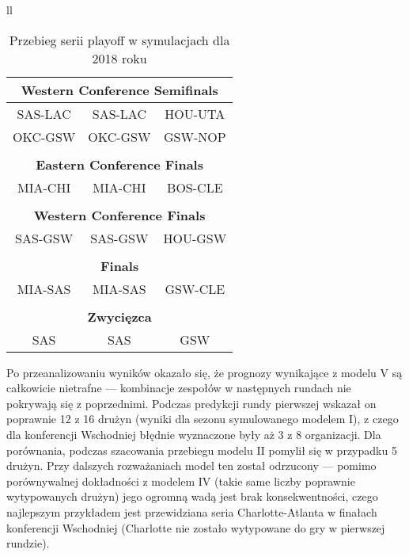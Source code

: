 \documentclass[inzynierska]{pwr_wmat_praca_dyplomowa}
\theoremstyle{plain}
\numberwithin{theorem}{chapter}
\theoremstyle{definition}
\numberwithin{theorem}{chapter}
\begin{document}
\begin{table}[]
\begin{tabular}{ll}
\begin{tabular}{ |c|c|c|  }
		\multicolumn{3}{|c|}{\textbf{Western Conference Semifinals}} \\\hline
		SAS-LAC& SAS-LAC&HOU-UTA\\\hline
		OKC-GSW& OKC-GSW&GSW-NOP\\\hline
		\multicolumn{3}{|c|}{} \\\hline
		
		\multicolumn{3}{|c|}{\textbf{Eastern Conference Finals}} \\\hline
		MIA-CHI& MIA-CHI&BOS-CLE\\\hline
		\multicolumn{3}{|c|}{} \\\hline
		
		\multicolumn{3}{|c|}{\textbf{Western Conference Finals}} \\\hline
		SAS-GSW& SAS-GSW&HOU-GSW\\\hline
		\multicolumn{3}{|c|}{} \\\hline
		
		\multicolumn{3}{|c|}{\textbf{Finals}} \\\hline
		MIA-SAS&  MIA-SAS&GSW-CLE\\\hline
		\multicolumn{3}{|c|}{} \\\hline
		
		\multicolumn{3}{|c|}{\textbf{Zwycięzca}} \\\hline
		SAS&  SAS&GSW\\\hline
	\end{tabular}
\end{tabular}
	\caption{Przebieg serii playoff w symulacjach dla 2018 roku}\label{tabela_playoffs2018}
\end{table}

Po przeanalizowaniu wyników okazało się, że prognozy wynikające z modelu V są całkowicie nietrafne --- kombinacje zespołów w następnych rundach nie pokrywają się z poprzednimi. Podczas predykcji rundy pierwszej wskazał on poprawnie 12 z 16 drużyn (wyniki dla sezonu symulowanego modelem I), z czego dla konferencji Wschodniej błędnie wyznaczone były aż 3 z 8 organizacji. Dla porównania, podczas szacowania przebiegu modelu II pomylił się w przypadku 5 drużyn. Przy dalszych rozważaniach model ten został odrzucony --- pomimo porównywalnej dokładności z modelem IV (takie same liczby poprawnie wytypowanych drużyn) jego ogromną wadą jest brak konsekwentności, czego najlepszym przykładem jest przewidziana seria Charlotte-Atlanta w finałach konferencji Wschodniej (Charlotte nie zostało wytypowane do gry w pierwszej rundzie).
 
\end{document}
